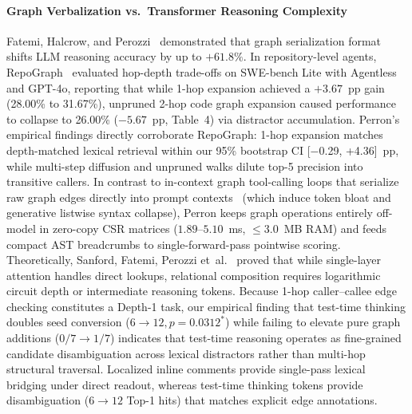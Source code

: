 \documentclass[10pt]{article}
\begin{document}
\paragraph{Graph Verbalization vs.\ Transformer Reasoning Complexity}
Fatemi, Halcrow, and Perozzi~\cite{fatemi2023talk} demonstrated that graph serialization format shifts LLM reasoning accuracy by up to $+61.8\%$. In repository-level agents, RepoGraph~\cite{ouyang2025repograph} evaluated hop-depth trade-offs on SWE-bench Lite with Agentless and GPT-4o, reporting that while 1-hop expansion achieved a $+3.67$~pp gain (28.00\% to 31.67\%), unpruned 2-hop code graph expansion caused performance to collapse to 26.00\% ($-5.67$~pp, Table~4) via distractor accumulation. Perron's empirical findings directly corroborate RepoGraph: 1-hop expansion matches depth-matched lexical retrieval within our 95\% bootstrap CI [$-$0.29, +4.36]~pp, while multi-step diffusion and unpruned walks dilute top-5 precision into transitive callers. In contrast to in-context graph tool-calling loops that serialize raw graph edges directly into prompt contexts~\cite{fatemi2023talk} (which induce token bloat and generative listwise syntax collapse), Perron keeps graph operations entirely off-model in zero-copy CSR matrices ($1.89\text{--}5.10$~ms, $\le 3.0$~MB RAM) and feeds compact AST breadcrumbs to single-forward-pass pointwise scoring. Theoretically, Sanford, Fatemi, Perozzi et~al.~\cite{sanford2024understanding} proved that while single-layer attention handles direct lookups, relational composition requires logarithmic circuit depth or intermediate reasoning tokens. Because 1-hop caller--callee edge checking constitutes a Depth-1 task, our empirical finding that test-time thinking doubles seed conversion ($6 \to 12, p=0.0312^*$) while failing to elevate pure graph additions ($0/7 \to 1/7$) indicates that test-time reasoning operates as fine-grained candidate disambiguation across lexical distractors rather than multi-hop structural traversal. Localized inline comments provide single-pass lexical bridging under direct readout, whereas test-time thinking tokens provide disambiguation ($6 \to 12$ Top-1 hits) that matches explicit edge annotations.
\end{document}
